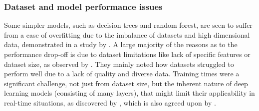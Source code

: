 
\subsubsection*{Dataset and model performance issues}
Some simpler models, such as decision trees and random forest, are seen to suffer from a case of overfitting due to the imbalance of datasets and high dimensional data, demonstrated in a study by \cite{harikrishnan2018machine}. A large majority of the reasons as to the performance drop-off is due to dataset limitations like lack of specific features or dataset size, as observed by \cite{ahmad2024across}. They mainly noted how datasets struggled to perform well due to a lack of quality and diverse data. Training times were a significant challenge, not just from dataset size, but the inherent nature of deep learning models (consisting of many layers), that might limit their applicability in real-time situations, as discovered by \cite{kapoor2024comparative}, which is also agreed upon by \cite{atlam2022business}.
